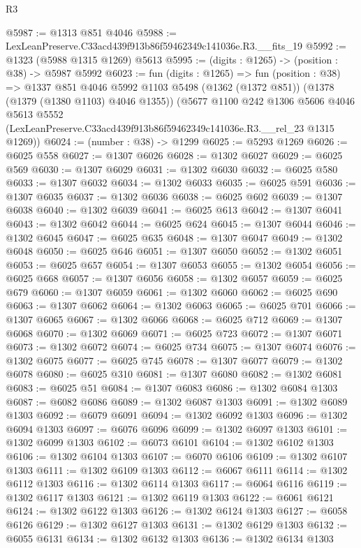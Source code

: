 \begin{lexlean}{R3}
\begin{coremodule}
@5987 := @1313 @851 @4046
@5988 := LexLeanPreserve.C33acd439f913b86f59462349c141036e.R3.__fits_19
@5992 := @1323 (@5988 @1315 @1269) @5613
@5995 := (digits : @1265) -> (position : @38) -> @5987 @5992
@6023 := fun (digits : @1265) =>
  fun (position : @38) =>
  @1337
    @851
    @4046
    @5992
    @1103
    @5498
    (@1362 (@1372 @851))
    (@1378 (@1379 (@1380 @1103) @4046 @1355))
    (@5677
      @1100
      @242
      @1306
      @5606
      @4046
      @5613
      @5552
      (LexLeanPreserve.C33acd439f913b86f59462349c141036e.R3.__rel_23 @1315 @1269))
@6024 := (number : @38) -> @1299
@6025 := @5293 @1269
@6026 := @6025 @558
@6027 := @1307 @6026
@6028 := @1302 @6027
@6029 := @6025 @569
@6030 := @1307 @6029
@6031 := @1302 @6030
@6032 := @6025 @580
@6033 := @1307 @6032
@6034 := @1302 @6033
@6035 := @6025 @591
@6036 := @1307 @6035
@6037 := @1302 @6036
@6038 := @6025 @602
@6039 := @1307 @6038
@6040 := @1302 @6039
@6041 := @6025 @613
@6042 := @1307 @6041
@6043 := @1302 @6042
@6044 := @6025 @624
@6045 := @1307 @6044
@6046 := @1302 @6045
@6047 := @6025 @635
@6048 := @1307 @6047
@6049 := @1302 @6048
@6050 := @6025 @646
@6051 := @1307 @6050
@6052 := @1302 @6051
@6053 := @6025 @657
@6054 := @1307 @6053
@6055 := @1302 @6054
@6056 := @6025 @668
@6057 := @1307 @6056
@6058 := @1302 @6057
@6059 := @6025 @679
@6060 := @1307 @6059
@6061 := @1302 @6060
@6062 := @6025 @690
@6063 := @1307 @6062
@6064 := @1302 @6063
@6065 := @6025 @701
@6066 := @1307 @6065
@6067 := @1302 @6066
@6068 := @6025 @712
@6069 := @1307 @6068
@6070 := @1302 @6069
@6071 := @6025 @723
@6072 := @1307 @6071
@6073 := @1302 @6072
@6074 := @6025 @734
@6075 := @1307 @6074
@6076 := @1302 @6075
@6077 := @6025 @745
@6078 := @1307 @6077
@6079 := @1302 @6078
@6080 := @6025 @310
@6081 := @1307 @6080
@6082 := @1302 @6081
@6083 := @6025 @51
@6084 := @1307 @6083
@6086 := @1302 @6084 @1303
@6087 := @6082 @6086
@6089 := @1302 @6087 @1303
@6091 := @1302 @6089 @1303
@6092 := @6079 @6091
@6094 := @1302 @6092 @1303
@6096 := @1302 @6094 @1303
@6097 := @6076 @6096
@6099 := @1302 @6097 @1303
@6101 := @1302 @6099 @1303
@6102 := @6073 @6101
@6104 := @1302 @6102 @1303
@6106 := @1302 @6104 @1303
@6107 := @6070 @6106
@6109 := @1302 @6107 @1303
@6111 := @1302 @6109 @1303
@6112 := @6067 @6111
@6114 := @1302 @6112 @1303
@6116 := @1302 @6114 @1303
@6117 := @6064 @6116
@6119 := @1302 @6117 @1303
@6121 := @1302 @6119 @1303
@6122 := @6061 @6121
@6124 := @1302 @6122 @1303
@6126 := @1302 @6124 @1303
@6127 := @6058 @6126
@6129 := @1302 @6127 @1303
@6131 := @1302 @6129 @1303
@6132 := @6055 @6131
@6134 := @1302 @6132 @1303
@6136 := @1302 @6134 @1303

\end{coremodule}
\end{lexlean}

